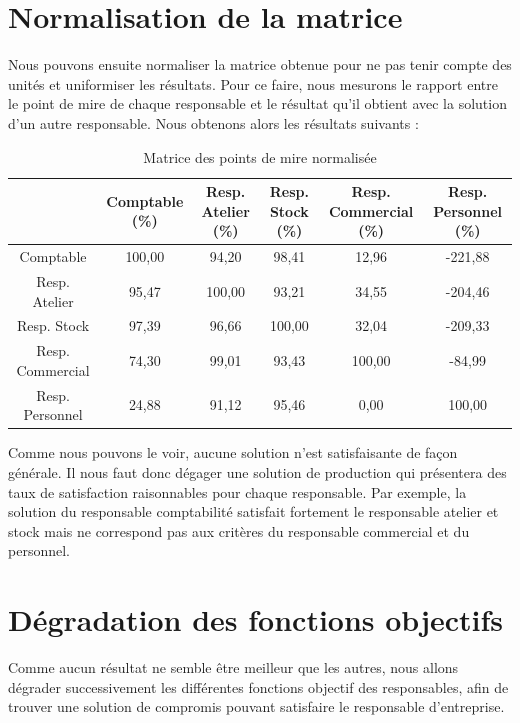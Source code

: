 \documentclass[paper=a4, fontsize=11pt]{report}
\numberwithin{equation}{section}		%
\numberwithin{figure}{section}			%
\numberwithin{table}{section}				%
\begin{document}
\section{Normalisation de la matrice}

Nous pouvons ensuite normaliser la matrice obtenue pour ne pas tenir compte des unités et uniformiser les résultats. Pour ce faire, nous mesurons le rapport entre le point de mire de chaque responsable et le résultat qu'il obtient avec la solution d'un autre responsable. Nous obtenons alors les résultats suivants : 

\begin{table}[H]
\begin{center}
\begin{tabular}{c|ccccc}
 & Comptable \scriptsize{(\%)} & Resp. Atelier \scriptsize{(\%)} & Resp. Stock \scriptsize{(\%)} & Resp. Commercial \scriptsize{(\%)} &  Resp. Personnel \scriptsize{(\%)}\\ 
\hline 
Comptable &  \cellcolor{black!5} 100,00 & 94,20 & 98,41 & 12,96 & -221,88 \\ 
Resp. Atelier & 95,47 & \cellcolor{black!5}100,00 & 93,21 & 34,55 & -204,46 \\ 
Resp. Stock & 97,39 & 96,66 & \cellcolor{black!5}100,00 & 32,04 & -209,33 \\ 
Resp. Commercial & 74,30 & 99,01 & 93,43 & \cellcolor{black!5}100,00 & -84,99 \\ 
Resp. Personnel & 24,88 & 91,12 & 95,46 & 0,00 & \cellcolor{black!5}100,00 \\ 
\end{tabular}
\caption{Matrice des points de mire normalisée} 
\end{center}
\end{table}

Comme nous pouvons le voir, aucune solution n'est satisfaisante de façon générale. Il nous faut donc dégager une solution de production qui présentera des taux de satisfaction raisonnables pour chaque responsable. Par exemple, la solution du responsable comptabilité satisfait fortement le responsable atelier et stock mais ne correspond pas aux critères du responsable commercial et du personnel.

\section{Dégradation des fonctions objectifs}

Comme aucun résultat ne semble être meilleur que les autres, nous allons dégrader successivement les différentes fonctions objectif des responsables, afin de trouver une solution de compromis pouvant satisfaire le responsable d'entreprise.\\
\end{document}

